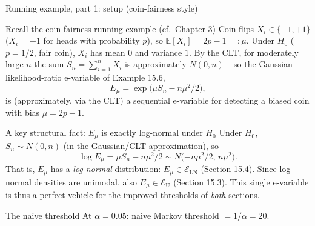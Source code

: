 \documentclass[aspectratio=169,10pt]{beamer}
\newcommand{\EE}{\mathbb{E}}
\newcommand{\EU}{\mathcal{E}_{\mathrm{U}}}
\newcommand{\ELN}{\mathcal{E}_{\mathrm{LN}}}
\begin{document}
\begin{frame}{Running example, part 1: setup (coin-fairness style)}
  \begin{block}{Recall the coin-fairness running example (cf.\ Chapter 3)}
    Coin flips $X_i\in\{-1,+1\}$ ($X_i=+1$ for heads with probability $p$), so $\EE[X_i]=2p-1=:\mu$. Under $H_0$ ($p=1/2$, fair coin), $X_i$ has mean $0$ and variance $1$. By the CLT, for moderately large $n$ the sum $S_n=\sum_{i=1}^n X_i$ is approximately $N(0,n)$ -- so the Gaussian likelihood-ratio e-variable of Example 15.6,
    \[
      E_\mu = \exp\big(\mu S_n - n\mu^2/2\big),
    \]
    is (approximately, via the CLT) a sequential e-variable for detecting a biased coin with bias $\mu=2p-1$.
  \end{block}
  \begin{block}{A key structural fact: $E_\mu$ is exactly log-normal under $H_0$}
    Under $H_0$, $S_n\sim N(0,n)$ (in the Gaussian/CLT approximation), so
    \[
      \log E_\mu = \mu S_n - n\mu^2/2 \sim N\big({-n\mu^2/2},\,n\mu^2\big).
    \]
    That is, $E_\mu$ has a \emph{log-normal} distribution: $E_\mu\in\ELN$ (Section 15.4). Since log-normal densities are unimodal, also $E_\mu\in\EU$ (Section 15.3). This single e-variable is thus a perfect vehicle for the improved thresholds of \emph{both} sections.
  \end{block}
  \begin{block}{The naive threshold}
    At $\alpha=0.05$: naive Markov threshold $=1/\alpha=20$.
  \end{block}
\end{frame}
\end{document}
